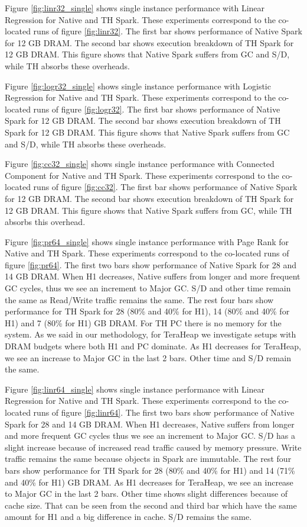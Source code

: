 Figure \ref{fig:linr32_single} shows single instance performance with Linear Regression for Native and TH Spark. These experiments correspond to the co-located runs of figure \ref{fig:linr32}. The first bar shows performance of Native Spark for 12 GB DRAM. The second bar shows execution breakdown of TH Spark for 12 GB DRAM. This figure shows that Native Spark suffers from GC and S/D, while TH absorbs these overheads.

Figure \ref{fig:logr32_single} shows single instance performance with Logistic Regression for Native and TH Spark. These experiments correspond to the co-located runs of figure \ref{fig:logr32}. The first bar shows performance of Native Spark for 12 GB DRAM. The second bar shows execution breakdown of TH Spark for 12 GB DRAM. This figure shows that Native Spark suffers from GC and S/D, while TH absorbs these overheads.

Figure \ref{fig:cc32_single} shows single instance performance with Connected Component for Native and TH Spark. These experiments correspond to the co-located runs of figure \ref{fig:cc32}. The first bar shows performance of Native Spark for 12 GB DRAM. The second bar shows execution breakdown of TH Spark for 12 GB DRAM. This figure shows that Native Spark suffers from GC, while TH absorbs this overhead.

Figure \ref{fig:pr64_single} shows single instance performance with Page Rank for Native and TH Spark. These experiments correspond to the co-located runs of figure \ref{fig:pr64}. The first two bars show performance of Native Spark for 28 and 14 GB DRAM. When H1 decreases, Native suffers from longer and more frequent GC cycles, thus we see an increment to Major GC. S/D and other time remain the same as Read/Write traffic remains the same. The rest four bars show performance for TH Spark for 28 (80\% and 40\% for H1), 14 (80\% and 40\% for H1) and 7 (80\% for H1) GB DRAM. For TH PC there is no memory for the system. As we said in our methodology, for TeraHeap we investigate setups with DRAM budgets where both H1 and PC dominate. As H1 decreases for TeraHeap, we see an increase to Major GC in the last 2 bars. Other time and S/D remain the same.

Figure \ref{fig:linr64_single} shows single instance performance with Linear Regression for Native and TH Spark. These experiments correspond to the co-located runs of figure \ref{fig:linr64}. The first two bars show performance of Native Spark for 28 and 14 GB DRAM. When H1 decreases, Native suffers from longer and more frequent GC cycles thus we see an increment to Major GC. S/D has a slight increase because of increased read traffic caused by memory pressure. Write traffic remains the same because objects in Spark are immutable. The rest four bars show performance for TH Spark for 28 (80\% and 40\% for H1) and 14 (71\% and 40\% for H1) GB DRAM. As H1 decreases for TeraHeap, we see an increase to Major GC in the last 2 bars. Other time shows slight differences because of cache size. That can be seen from the second and third bar which have the same amount for H1 and a big difference in cache. S/D remains the same.

